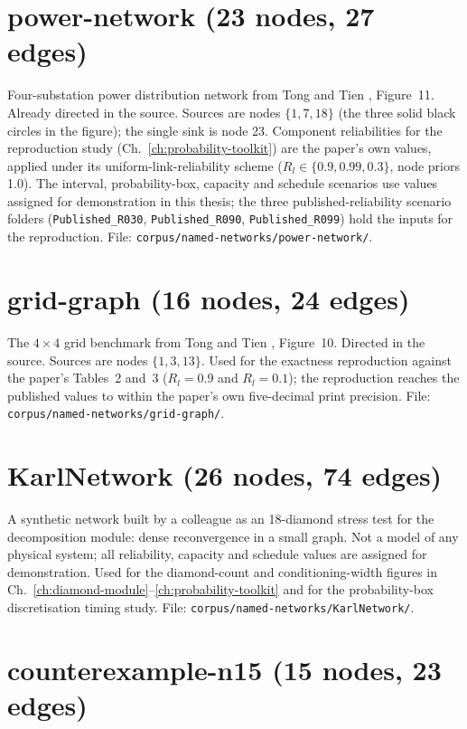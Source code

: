 \documentclass[12pt]{report}
\providecommand{\filepath}[1]{\nolinkurl{#1}}
\begin{document}
\section{power-network (23 nodes, 27 edges)}
\label{sec:appA-power}

Four-substation power distribution network from Tong and Tien \cite{tong2019directed},
Figure~11. Already directed in the source. Sources are nodes $\{1, 7, 18\}$ (the three
solid black circles in the figure); the single sink is node 23. Component reliabilities
for the reproduction study (Ch.~\ref{ch:probability-toolkit}) are the paper's own values,
applied under its uniform-link-reliability scheme ($R_l \in \{0.9, 0.99, 0.3\}$, node
priors 1.0). The interval, probability-box, capacity and schedule scenarios use values
assigned for demonstration in this thesis; the three published-reliability scenario folders
(\filepath{Published_R030}, \filepath{Published_R090}, \filepath{Published_R099}) hold the
inputs for the reproduction. File: \filepath{corpus/named-networks/power-network/}.

\section{grid-graph (16 nodes, 24 edges)}
\label{sec:appA-grid}

The $4\times4$ grid benchmark from Tong and Tien \cite{tong2019directed}, Figure~10.
Directed in the source. Sources are nodes $\{1, 3, 13\}$. Used for the exactness
reproduction against the paper's Tables~2 and~3 ($R_l = 0.9$ and $R_l = 0.1$); the
reproduction reaches the published values to within the paper's own five-decimal print
precision. File: \filepath{corpus/named-networks/grid-graph/}.

\section{KarlNetwork (26 nodes, 74 edges)}
\label{sec:appA-karl}

A synthetic network built by a colleague as an 18-diamond stress test for the
decomposition module: dense reconvergence in a small graph. Not a model of any physical
system; all reliability, capacity and schedule values are assigned for demonstration. Used
for the diamond-count and conditioning-width figures in
Ch.~\ref{ch:diamond-module}--\ref{ch:probability-toolkit} and for the probability-box
discretisation timing study. File: \filepath{corpus/named-networks/KarlNetwork/}.

\section{counterexample-n15 (15 nodes, 23 edges)}
\label{sec:appA-cex}
\end{document}
